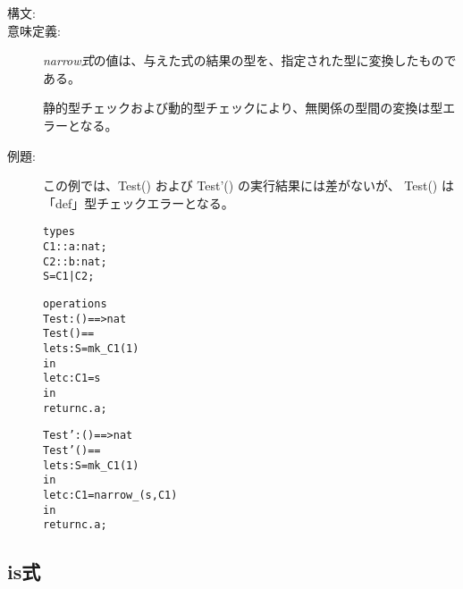 \documentclass[\pformat,12pt]{jarticle}
\begin{document}
\begin{description}
\item[構文:] 

\item[意味定義:] {\it narrow式}の値は、与えた式の結果の型を、指定された型に変換したものである。

静的型チェックおよび動的型チェックにより、無関係の型間の変換は型エラーとなる。

\item[例題:]
この例では、Test() および Test'() の実行結果には差がないが、
Test() は「def」型チェックエラーとなる。

\begin{alltt}
types
C1 :: a : nat;
C2 :: b : nat;
S = C1 | C2;

operations
Test: () ==> nat
Test() ==
 let s : S = mk_C1(1)
 in
   let c : C1 = s
   in
     return c.a;

Test': () ==> nat
Test'() ==
 let s : S = mk_C1(1)
 in
   let c : C1 = narrow_(s, C1)
   in
     return c.a;
\end{alltt}


\end{description}


\subsection{is式}
\end{document}
